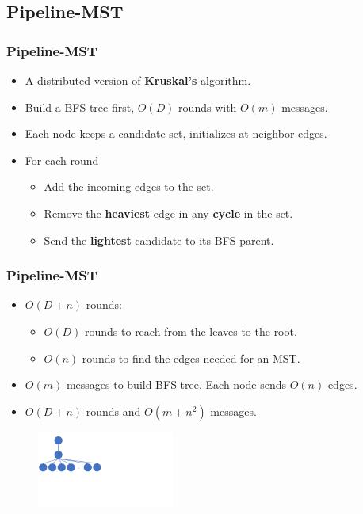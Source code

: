 \subsection{Pipeline-MST}
\begin{frame}
\frametitle{Pipeline-MST}
\begin{itemize}
    \item A distributed version of \textbf{Kruskal's} algorithm.
    \item Build a BFS tree first, $O(D)$ rounds with $O(m)$ messages.
    \item Each node keeps a candidate set, initializes at neighbor edges.
    \item For each round
    \begin{itemize}
        \item Add the incoming edges to the set.
        \item Remove the \textbf{heaviest} edge in any \textbf{cycle} in the set.
        \item Send the \textbf{lightest} candidate to its BFS parent.
    \end{itemize}
\end{itemize}
\end{frame}

\begin{frame}
\frametitle{Pipeline-MST}
\begin{itemize}
    \item $O(D+n)$ rounds:
    \begin{itemize}
        \item $O(D)$ rounds to reach from the leaves to the root.
        \item $O(n)$ rounds to find the edges needed for an MST.
    \end{itemize}
    \item $O(m)$ messages to build BFS tree. Each node sends $O(n)$ edges.
    \item $O(D+n)$ rounds and $O(m + n^2)$ messages.
\end{itemize}
\begin{figure}
\includegraphics[width=0.4\textwidth,trim={0cm 7cm 18cm 0},clip]{figures/pipeline1.pdf}
\end{figure}
\end{frame}

